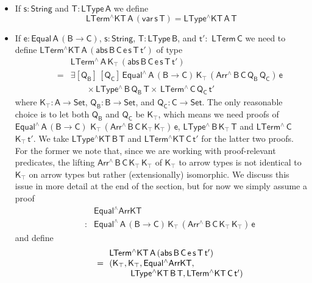 \documentclass[sigplan,10pt]{acmart}
\begin{document}
\begin{itemize}
\item If $\mathsf{s : String}$ and $\mathsf{T : LType\,A}$ we define
  \[\mathsf{LTerm^\wedge KT\,A\,(var\,s\,T)} = \mathsf{LType^\wedge
  KT\,A\,T}\]
\item If $\mathsf{e : Equal\,A\,(B \to C)}$, $\mathsf{s : String}$,
  $\mathsf{T : LType\,B}$, and $\mathsf{t' :}$ $\mathsf{LTerm\,C}$ we
  need to define $\mathsf{LTerm^\wedge KT\,A\, (abs\, B \,C \, e \,s
    \,T \, t')}$ of type
\[\begin{array}{ll}
 & \!\!\mathsf{LTerm^{\wedge}\,A\,K_\top\, (abs \,B \,C \,e \,s \,T
  \,t')}\\
\quad\quad = & \!\!\mathsf{\exists [Q_B]\, [Q_C]\, Equal^{\wedge} \, A\, (B \to
  C)\, K_\top\, (Arr^{\wedge} \, B\, C\, Q_B \, Q_C)\, e }\\
 & \quad\quad\mathsf{\times \, LType^{\wedge}\, B\, Q_B\, T \times \,
  LTerm^{\wedge}\, C\, Q_C\,t' }
\end{array}\]
where $\mathsf{K_\top : A \to Set}$, $\mathsf{Q_B : B \to Set}$, and
$\mathsf{Q_C : C \to Set}$.  The only reasonable choice is to let both
$\mathsf{Q_B}$ and $\mathsf{Q_C}$ be $\mathsf{K_\top}$, which means we
need proofs of
$\mathsf{Equal^{\wedge} \, A\, (B \to C)}$ $\mathsf{K_\top\,
  (Arr^{\wedge} \, B\, C\, K_\top \, K_\top)\, e}$,
$\mathsf{LType^{\wedge}\, B\, K_\top\, T}$ and
$\mathsf{LTerm^{\wedge}\, C}$ $\mathsf{K_\top\, t'}$.  We take
$\mathsf{LType^\wedge KT\, B\, T}$ and $\mathsf{LTerm^\wedge KT\, C\,
  t'}$ for the latter two proofs. For the former we note that, since
we are working with proof-relevant predicates, the lifting
$\mathsf{Arr^{\wedge} \, B\, C\, K_\top \, K_\top}$ of
$\mathsf{K_\top}$ to arrow types is not identical to $\mathsf{K_\top}$
on arrow types but rather (extensionally) isomorphic.  We discuss this
issue in more detail at the end of the section, but for now we simply
assume a proof \[\begin{array}{ll}
&\!\! \mathsf{Equal^\wedge ArrKT}\\
\quad\quad  : & \!\!\mathsf{Equal^{\wedge} \, A\, (B
  \to C)\, K_\top\, (Arr^{\wedge} \, B\, C\, K_\top \, K_\top)\, e}
\end{array}\]
and define
\[\begin{array}{ll}
 & \!\!\mathsf{LTerm^\wedge KT\,A\, (abs\, B \,C \, e \,s \,T \,
  t')}\\
\quad\quad= & \!\!\mathsf{(K_\top , K_\top , Equal^\wedge ArrKT ,}\\
 & \hspace*{0.3in} \mathsf{LType^\wedge KT\, B\, T , LTerm^\wedge KT\, C\, t') }

\end{array}\]
\end{itemize}
\end{document}
